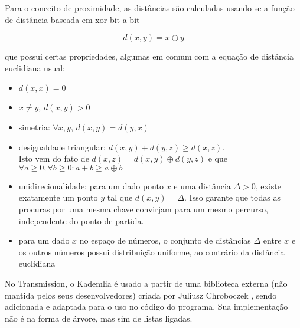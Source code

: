 Para o conceito de proximidade, as distâncias são calculadas usando-se a função de
distância baseada em \gls{xor} bit a bit

\begin{equation}
    d(x,y) = x \oplus y
\end{equation}

que possui certas propriedades, algumas em comum com a equação de distância euclidiana
usual:

\begin{itemize}
    \item $d(x,x) = 0$
    \item $x \neq y$, $d(x,y) > 0$
    \item simetria: $\forall x,y$, $d(x,y) = d(y,x)$
    \item desigualdade triangular: $d(x,y) + d(y,z) \geq d(x,z)$. \\
        Isto vem do fato de $d(x,z) = d(x,y) \oplus d(y,z)$ e que $\forall a \geq 0,
        \forall b \geq 0 : a + b \geq a \oplus b$
    \item unidirecionalidade: para um dado ponto $x$ e uma distância $\Delta > 0$,
        existe exatamente um ponto $y$ tal que $d(x,y) = \Delta$. Isso garante que todas
        as procuras por uma mesma chave convirjam para um mesmo percurso, independente
        do ponto de partida.
    \item para um dado $x$ no espaço de números, o conjunto de distâncias $\Delta$ entre
        $x$ e os outros números possui distribuição uniforme, ao contrário da distância
        euclidiana \cite{bittorrentcom:dht}
\end{itemize}

No Transmission, o Kademlia é usado a partir de uma biblioteca externa (não mantida
pelos seus desenvolvedores) criada por Juliusz Chroboczek \cite{repo:dht-c}, sendo
adicionada e adaptada para o uso no código do programa. Sua implementação não é na forma
de árvore, mas sim de listas ligadas.

